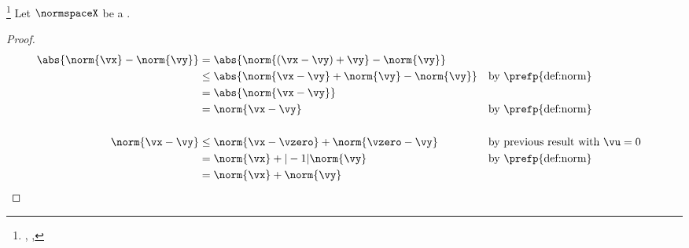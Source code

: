 \begin{theorem}
\footnote{
  ,
  ,
  }
\label{thm:shortest_dist}
\label{thm:rti}
Let $\normspaceX$ be a  .
\end{theorem}
\begin{proof}
\begin{align*}
  \abs{\norm{\vx} - \norm{\vy}}
    &=   \abs{\norm{({\vx}-{\vy})+\vy} - \norm{\vy}}
  \\&\le \abs{\norm{{\vx}-{\vy}} + \norm{\vy} - \norm{\vy}}
    &&   \text{by \prefp{def:norm}}
  \\&=   \abs{\norm{{\vx}-{\vy}} }
  \\&=   \norm{{\vx}-{\vy}}
    &&   \text{by \prefp{def:norm}}
  \\
  \\
  \norm{{\vx}-{\vy}}
    &\le \norm{{\vx}-\vzero}+\norm{\vzero-{\vy}}
    &&   \text{by previous result with ${\vu}=0$}
  \\&=   \norm{\vx}+|-1|\norm{\vy}
    &&   \text{by \prefp{def:norm}}
  \\&=   \norm{\vx}+    \norm{\vy}
\end{align*}
\end{proof}



